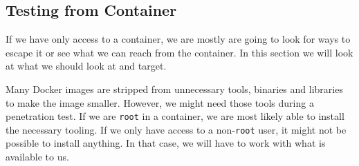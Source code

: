\subsection{Testing from Container}
If we have only access to a container, we are mostly are going to look for ways to escape it or see what we can reach from the container. In this section we will look at what we should look at and target.

\hfill

Many Docker images are stripped from unnecessary tools, binaries and libraries to make the image smaller. However, we might need those tools during a penetration test. If we are \lstinline{root} in a container, we are most likely able to install the necessary tooling. If we only have access to a non-\lstinline{root} user, it might not be possible to install anything. In that case, we will have to work with what is available to us.








